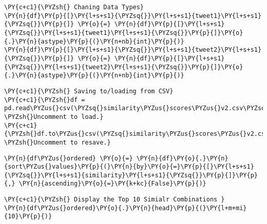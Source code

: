     \begin{tcolorbox}[breakable, size=fbox, boxrule=1pt, pad at break*=1mm,colback=cellbackground, colframe=cellborder]
\begin{Verbatim}[commandchars=\\\{\}]
\PY{c+c1}{\PYZsh{} Chaning Data Types}
\PY{n}{df}\PY{p}{[}\PY{l+s+s1}{\PYZsq{}}\PY{l+s+s1}{tweet1}\PY{l+s+s1}{\PYZsq{}}\PY{p}{]} \PY{o}{=} \PY{n}{df}\PY{p}{[}\PY{l+s+s1}{\PYZsq{}}\PY{l+s+s1}{tweet1}\PY{l+s+s1}{\PYZsq{}}\PY{p}{]}\PY{o}{.}\PY{n}{astype}\PY{p}{(}\PY{n+nb}{int}\PY{p}{)}
\PY{n}{df}\PY{p}{[}\PY{l+s+s1}{\PYZsq{}}\PY{l+s+s1}{tweet2}\PY{l+s+s1}{\PYZsq{}}\PY{p}{]} \PY{o}{=} \PY{n}{df}\PY{p}{[}\PY{l+s+s1}{\PYZsq{}}\PY{l+s+s1}{tweet2}\PY{l+s+s1}{\PYZsq{}}\PY{p}{]}\PY{o}{.}\PY{n}{astype}\PY{p}{(}\PY{n+nb}{int}\PY{p}{)}
\end{Verbatim}
\end{tcolorbox}

    \begin{tcolorbox}[breakable, size=fbox, boxrule=1pt, pad at break*=1mm,colback=cellbackground, colframe=cellborder]
\begin{Verbatim}[commandchars=\\\{\}]
\PY{c+c1}{\PYZsh{} Saving to/loading from CSV}
\PY{c+c1}{\PYZsh{}df = pd.read\PYZus{}csv(\PYZsq{}similarity\PYZus{}scores\PYZus{}v2.csv\PYZsq{}) \PYZsh{}Uncomment to load.}
\PY{c+c1}{\PYZsh{}df.to\PYZus{}csv(\PYZsq{}similarity\PYZus{}scores\PYZus{}v2.csv\PYZsq{}) \PYZsh{}Uncomment to resave.}
\end{Verbatim}
\end{tcolorbox}

    \begin{tcolorbox}[breakable, size=fbox, boxrule=1pt, pad at break*=1mm,colback=cellbackground, colframe=cellborder]
\begin{Verbatim}[commandchars=\\\{\}]
\PY{n}{df\PYZus{}ordered} \PY{o}{=} \PY{n}{df}\PY{o}{.}\PY{n}{sort\PYZus{}values}\PY{p}{(}\PY{n}{by}\PY{o}{=}\PY{p}{[}\PY{l+s+s1}{\PYZsq{}}\PY{l+s+s1}{similarity}\PY{l+s+s1}{\PYZsq{}}\PY{p}{]}\PY{p}{,} \PY{n}{ascending}\PY{o}{=}\PY{k+kc}{False}\PY{p}{)}
\end{Verbatim}
\end{tcolorbox}

    \begin{tcolorbox}[breakable, size=fbox, boxrule=1pt, pad at break*=1mm,colback=cellbackground, colframe=cellborder]
\begin{Verbatim}[commandchars=\\\{\}]
\PY{c+c1}{\PYZsh{} Display the Top 10 Simialr Combinations }
\PY{n}{df\PYZus{}ordered}\PY{o}{.}\PY{n}{head}\PY{p}{(}\PY{l+m+mi}{10}\PY{p}{)}
\end{Verbatim}
\end{tcolorbox}

